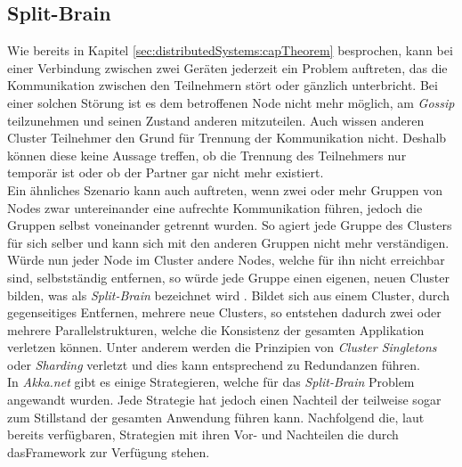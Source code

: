 \subsection{Split-Brain} 
\label{subsec:implementation:splitBrain}
Wie bereits in Kapitel \ref{sec:distributedSystems:capTheorem} besprochen, kann bei einer Verbindung zwischen zwei Geräten jederzeit ein Problem auftreten, das die Kommunikation zwischen den Teilnehmern stört oder gänzlich unterbricht. Bei einer solchen Störung ist es dem betroffenen Node nicht mehr möglich, am \textit{Gossip} teilzunehmen und seinen Zustand anderen mitzuteilen. Auch wissen anderen Cluster Teilnehmer den Grund für Trennung der Kommunikation nicht. Deshalb können diese keine Aussage treffen, ob die Trennung des Teilnehmers nur temporär ist oder ob der Partner gar nicht mehr existiert. \\
Ein ähnliches Szenario kann auch auftreten, wenn zwei oder mehr Gruppen von Nodes zwar untereinander eine aufrechte Kommunikation führen, jedoch die Gruppen selbst voneinander getrennt wurden. So agiert jede Gruppe des Clusters für sich selber und kann sich mit den anderen Gruppen nicht mehr verständigen. Würde nun jeder Node im Cluster andere Nodes, welche für ihn nicht erreichbar sind, selbstständig entfernen, so würde jede Gruppe einen eigenen, neuen Cluster bilden, was als \textit{Split-Brain} bezeichnet wird \citep{networkIsReliable}. Bildet sich aus einem Cluster, durch gegenseitiges Entfernen, mehrere neue Clusters, so entstehen dadurch zwei oder mehrere Parallelstrukturen, welche die Konsistenz der gesamten Applikation verletzen können. Unter anderem werden die Prinzipien von \textit{Cluster Singletons} oder \textit{Sharding} verletzt und dies kann entsprechend zu Redundanzen führen. \\
In \textit{Akka.net} gibt es einige Strategieren, welche für das \textit{Split-Brain} Problem angewandt wurden. Jede Strategie hat jedoch einen Nachteil der teilweise sogar zum Stillstand der gesamten Anwendung führen kann. Nachfolgend die, laut \cite{Akka.netCommunityAkka.NETDocumentation} bereits verfügbaren, Strategien mit ihren Vor- und Nachteilen die durch dasFramework zur Verfügung stehen.
